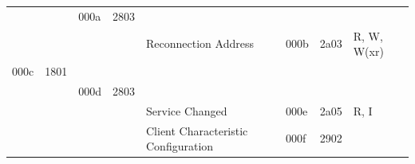 \documentclass[conference]{IEEEtran}
\begin{document}
\begin{landscape}
\begin{table}[ht]
\begin{tabular}{@{}llllllll@{}}
                            &                             & \cellcolor[HTML]{FFFE65}000a & \cellcolor[HTML]{FFFE65}2803 & \cellcolor[HTML]{FFFE65}                                                               & \cellcolor[HTML]{FFFE65} & \cellcolor[HTML]{FFFE65}         & \cellcolor[HTML]{FFFE65}                                                                                           \\
                            &                             &                              &                              & Reconnection Address                                                                   & 000b                     & 2a03                             & R, W, W(xr)                                                                                                        \\
\rowcolor[HTML]{3166FF} 
{\color[HTML]{000000} 000c} & {\color[HTML]{000000} 1801} & {\color[HTML]{000000} }      & {\color[HTML]{000000} }      & {\color[HTML]{000000} }                                                                & {\color[HTML]{000000} }  & {\color[HTML]{000000} }          & {\color[HTML]{000000} }                                                                                            \\
                            &                             & \cellcolor[HTML]{FFFE65}000d & \cellcolor[HTML]{FFFE65}2803 & \cellcolor[HTML]{FFFE65}                                                               & \cellcolor[HTML]{FFFE65} & \cellcolor[HTML]{FFFE65}         & \cellcolor[HTML]{FFFE65}                                                                                           \\
                            &                             &                              &                              & Service Changed                                                                        & 000e                     & 2a05                             & R, I                                                                                                               \\
                            &                             &                              &                              & Client Characteristic Configuration                                                    & 000f                     & 2902                             &                                                                                                                    \\

\end{tabular}
\end{table}
\end{landscape}
\end{document}
